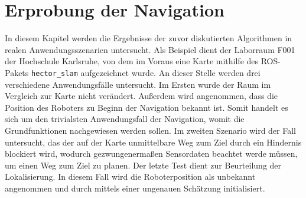\chapter{Erprobung der Navigation}
In diesem Kapitel werden die Ergebnisse der zuvor diskutierten Algorithmen in realen Anwendungsszenarien untersucht. Als Beispiel dient der Laborraum F001 der Hochschule Karlsruhe, von dem im Voraus eine Karte mithilfe des ROS-Pakets \lstinline{hector_slam}{} aufgezeichnet wurde. An dieser Stelle werden drei verschiedene Anwendungsfälle untersucht. Im Ersten wurde der Raum im Vergleich zur Karte nicht verändert. Außerdem wird angenommen, dass die Position des Roboters zu Beginn der Navigation bekannt ist. Somit handelt es sich um den trivialsten Anwendungsfall der Navigation, womit die Grundfunktionen nachgewiesen werden sollen.
Im zweiten Szenario wird der Fall untersucht, das der auf der Karte unmittelbare Weg zum Ziel durch ein Hindernis blockiert wird, wodurch gezwungenermaßen Sensordaten beachtet werde müssen, um einen Weg zum Ziel zu planen.
Der letzte Test dient zur Beurteilung der Lokalisierung. In diesem Fall wird die Roboterposition als unbekannt angenommen und durch mittels einer ungenauen Schätzung initialisiert. 

\newpage


\newpage


\newpage
